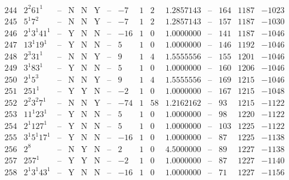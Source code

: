 \documentclass[11pt,reqno,a4letter]{article}
\numberwithin{figure}{section}
\numberwithin{table}{section}
\theoremstyle{plain}
\numberwithin{theorem}{section}
\theoremstyle{definition}
\begin{document}
\begin{table}[h!]
\begin{equation*}
{\begin{array}{|cc|c|ccc|c|c|ccc|c|ccc}
 244 & 2^2 61^1 & \text{--} & \text{N} & \text{N} & \text{Y} & \text{--} & -7 & 1 & 2 & 1.2857143 & \text{--} & 164 & 1187 & -1023 \\
 245 & 5^1 7^2 & \text{--} & \text{N} & \text{N} & \text{Y} & \text{--} & -7 & 1 & 2 & 1.2857143 & \text{--} & 157 & 1187 & -1030 \\
 246 & 2^1 3^1 41^1 & \text{--} & \text{Y} & \text{N} & \text{N} & \text{--} & -16 & 1 & 0 & 1.0000000 & \text{--} & 141 & 1187 & -1046 \\
 247 & 13^1 19^1 & \text{--} & \text{Y} & \text{N} & \text{N} & \text{--} & 5 & 1 & 0 & 1.0000000 & \text{--} & 146 & 1192 & -1046 \\
 248 & 2^3 31^1 & \text{--} & \text{N} & \text{N} & \text{Y} & \text{--} & 9 & 1 & 4 & 1.5555556 & \text{--} & 155 & 1201 & -1046 \\
 249 & 3^1 83^1 & \text{--} & \text{Y} & \text{N} & \text{N} & \text{--} & 5 & 1 & 0 & 1.0000000 & \text{--} & 160 & 1206 & -1046 \\
 250 & 2^1 5^3 & \text{--} & \text{N} & \text{N} & \text{Y} & \text{--} & 9 & 1 & 4 & 1.5555556 & \text{--} & 169 & 1215 & -1046 \\
 251 & 251^1 & \text{--} & \text{Y} & \text{Y} & \text{N} & \text{--} & -2 & 1 & 0 & 1.0000000 & \text{--} & 167 & 1215 & -1048 \\
 252 & 2^2 3^2 7^1 & \text{--} & \text{N} & \text{N} & \text{Y} & \text{--} & -74 & 1 & 58 & 1.2162162 & \text{--} & 93 & 1215 & -1122 \\
 253 & 11^1 23^1 & \text{--} & \text{Y} & \text{N} & \text{N} & \text{--} & 5 & 1 & 0 & 1.0000000 & \text{--} & 98 & 1220 & -1122 \\
 254 & 2^1 127^1 & \text{--} & \text{Y} & \text{N} & \text{N} & \text{--} & 5 & 1 & 0 & 1.0000000 & \text{--} & 103 & 1225 & -1122 \\
 255 & 3^1 5^1 17^1 & \text{--} & \text{Y} & \text{N} & \text{N} & \text{--} & -16 & 1 & 0 & 1.0000000 & \text{--} & 87 & 1225 & -1138 \\
 256 & 2^8 & \text{--} & \text{N} & \text{Y} & \text{N} & \text{--} & 2 & 1 & 0 & 4.5000000 & \text{--} & 89 & 1227 & -1138 \\
 257 & 257^1 & \text{--} & \text{Y} & \text{Y} & \text{N} & \text{--} & -2 & 1 & 0 & 1.0000000 & \text{--} & 87 & 1227 & -1140 \\
 258 & 2^1 3^1 43^1 & \text{--} & \text{Y} & \text{N} & \text{N} & \text{--} & -16 & 1 & 0 & 1.0000000 & \text{--} & 71 & 1227 & -1156 \\

\end{array}}
\end{equation*}
\end{table}
\end{document}
